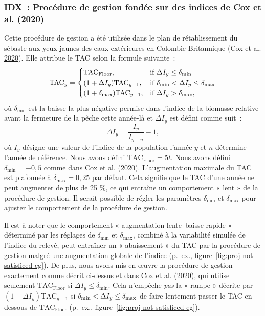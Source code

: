 \documentclass[11pt]{book}
\newcommand{\lt}{\ensuremath <}
\newcommand{\gt}{\ensuremath >}
\begin{document}
\hypertarget{sec:mp-idx}{%
\subsubsection{\texorpdfstring{IDX~: Procédure de gestion fondée sur des indices de Cox et al. (\protect\hyperlink{ref-cox2020}{2020})}{IDX~: Procédure de gestion fondée sur des indices de Cox et al. (2020)}}\label{sec:mp-idx}}

Cette procédure de gestion a été utilisée dans le plan de rétablissement du sébaste aux yeux jaunes des eaux extérieures en Colombie-Britannique (Cox et al. \protect\hyperlink{ref-cox2020}{2020}). Elle attribue le TAC selon la formule suivante~:
\begin{equation}
\textrm{TAC}_y =
\begin{cases}
\textrm{TAC}_\textrm{Floor}, & \textrm{if}\ \Delta I_y \leq \delta_\textrm{min} \\
(1 + \Delta I_y ) \textrm{TAC}_{y-1}, & \textrm{if}\ \delta_\textrm{min} \lt \Delta I_y \leq \delta_\textrm{max} \\
(1 + \delta_\textrm{max}) \textrm{TAC}_{y-1}, & \textrm{if}\ \Delta I_y \gt \delta_\textrm{max},
\end{cases}
\end{equation}
où \(\delta_\textrm{min}\) est la baisse la plus négative permise dans l'indice de la biomasse relative avant la fermeture de la pêche cette année-là et \(\Delta I_y\) est défini comme suit~:
\begin{equation}
\Delta I_y = \frac{I_y}{I_{y-n}} - 1,
\end{equation}
où \(I_y\) désigne une valeur de l'indice de la population l'année \(y\) et \(n\) détermine l'année de référence. Nous avons défini \(\textrm{TAC}_\textrm{Floor} = 5 t\). Nous avons défini \(\delta_\textrm{min} = -0,5\) comme dans Cox et al. (\protect\hyperlink{ref-cox2020}{2020}). L'augmentation maximale du TAC est plafonnée à \(\delta_\textrm{max} = 0,25\) par défaut. Cela signifie que le TAC d'une année ne peut augmenter de plus de 25 \%, ce qui entraîne un comportement « lent » de la procédure de gestion. Il serait possible de régler les paramètres \(\delta_\textrm{min}\) et \(\delta_\textrm{max}\) pour ajuster le comportement de la procédure de gestion.

Il est à noter que le comportement « augmentation lente--baisse rapide » déterminé par les réglages de \(\delta_\textrm{min}\) et \(\delta_\textrm{max}\), combiné à la variabilité simulée de l'indice du relevé, peut entraîner un « abaissement » du TAC par la procédure de gestion malgré une augmentation globale de l'indice (p.~ex., figure~\ref{fig:proj-not-satisficed-eg}). De plus, nous avons mis en œuvre la procédure de gestion exactement comme décrit ci-dessus et dans Cox et al. (\protect\hyperlink{ref-cox2020}{2020}), qui utilise seulement \(\textrm{TAC}_\textrm{Floor}\) si \(\Delta I_y \leq \delta_\textrm{min}\). Cela n'empêche \emph{pas} la « rampe » décrite par \((1 + \Delta I_y ) \textrm{TAC}_{y-1}\) si \(\delta_\textrm{min} \lt \Delta I_y \leq \delta_\textrm{max}\) de faire lentement passer le TAC en dessous de \(\textrm{TAC}_\textrm{Floor}\) (p.~ex., figure~\ref{fig:proj-not-satisficed-eg}).
\end{document}
